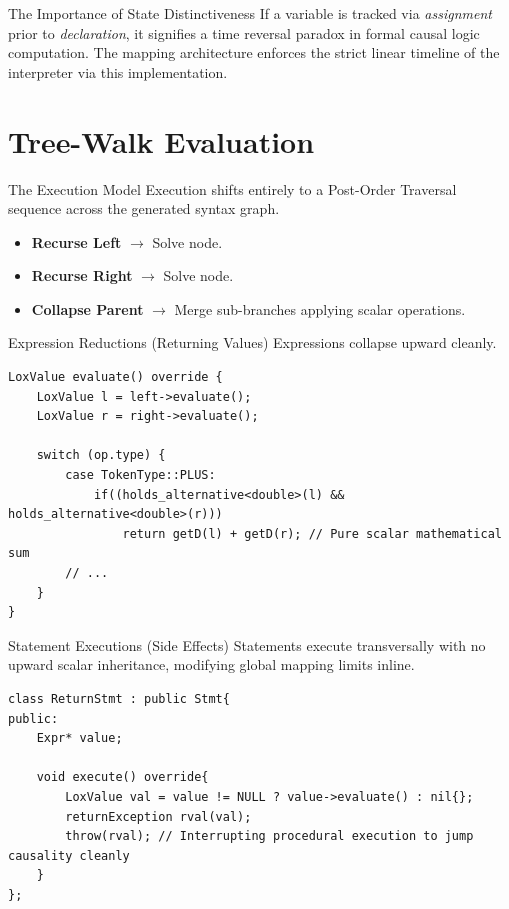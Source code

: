 \documentclass[aspectratio=169]{beamer}
\begin{document}
\begin{frame}{The Importance of State Distinctiveness}
    If a variable is tracked via \textit{assignment} prior to \textit{declaration}, it signifies a time reversal paradox in formal causal logic computation. The mapping architecture enforces the strict linear timeline of the interpreter via this implementation.
\end{frame}


\section{Tree-Walk Evaluation}

\begin{frame}{The Execution Model}
    Execution shifts entirely to a Post-Order Traversal sequence across the generated syntax graph. 
    \begin{itemize}
        \item \textbf{Recurse Left} $\rightarrow$ Solve node.
        \item \textbf{Recurse Right} $\rightarrow$ Solve node.
        \item \textbf{Collapse Parent} $\rightarrow$ Merge sub-branches applying scalar operations.
    \end{itemize}
\end{frame}

\begin{frame}[fragile]{Expression Reductions (Returning Values)}
    Expressions collapse upward cleanly.
    \begin{lstlisting}
LoxValue evaluate() override {
    LoxValue l = left->evaluate();
    LoxValue r = right->evaluate();

    switch (op.type) {
        case TokenType::PLUS:
            if((holds_alternative<double>(l) && holds_alternative<double>(r)))
                return getD(l) + getD(r); // Pure scalar mathematical sum
        // ...
    }
}
    \end{lstlisting}
\end{frame}

\begin{frame}[fragile]{Statement Executions (Side Effects)}
    Statements execute transversally with no upward scalar inheritance, modifying global mapping limits inline.
    \begin{lstlisting}
class ReturnStmt : public Stmt{
public:
    Expr* value;

    void execute() override{
        LoxValue val = value != NULL ? value->evaluate() : nil{};
        returnException rval(val);
        throw(rval); // Interrupting procedural execution to jump causality cleanly
    }
};
    \end{lstlisting}
\end{frame}
\end{document}
